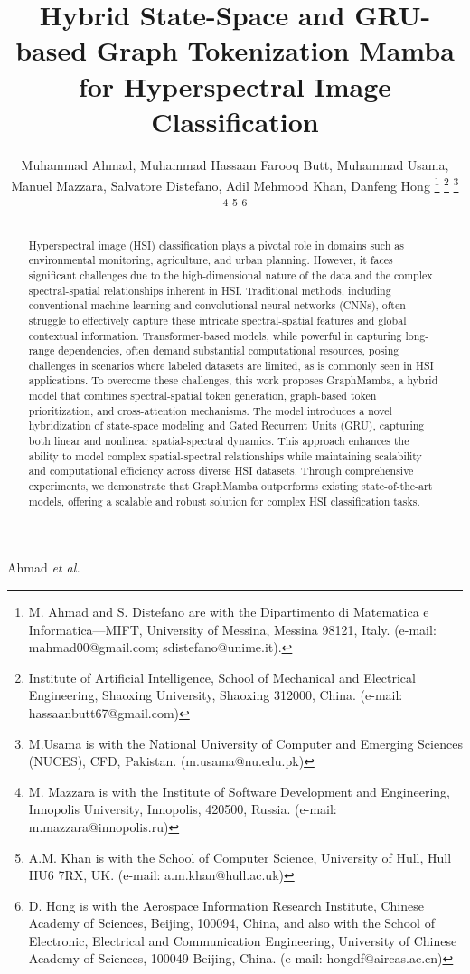 \documentclass[journal]{IEEEtran}
\begin{document}
\title{Hybrid State-Space and GRU-based Graph Tokenization Mamba for Hyperspectral Image Classification}
\author{Muhammad Ahmad, Muhammad Hassaan Farooq Butt, Muhammad Usama, Manuel Mazzara, Salvatore Distefano, Adil Mehmood Khan, Danfeng Hong
\thanks{M. Ahmad and S. Distefano are with the Dipartimento di Matematica e Informatica---MIFT, University of Messina, Messina 98121, Italy. (e-mail: mahmad00@gmail.com; sdistefano@unime.it).}
\thanks{Institute of Artificial Intelligence, School of Mechanical and Electrical Engineering, Shaoxing University, Shaoxing 312000, China. (e-mail: hassaanbutt67@gmail.com)}
\thanks{M.Usama is with the National University of Computer and Emerging Sciences (NUCES), CFD, Pakistan. (m.usama@nu.edu.pk)}
\thanks{M. Mazzara is with the Institute of Software Development and Engineering, Innopolis University, Innopolis, 420500, Russia. (e-mail: m.mazzara@innopolis.ru)}
\thanks{A.M. Khan is with the School of Computer Science, University of Hull, Hull HU6 7RX, UK. (e-mail: a.m.khan@hull.ac.uk)}
\thanks{D. Hong is with the Aerospace Information Research Institute, Chinese Academy of Sciences, Beijing, 100094, China, and also with the School of Electronic, Electrical and Communication Engineering, University of Chinese Academy of Sciences, 100049 Beijing, China. (e-mail: hongdf@aircas.ac.cn)}
}
{Ahmad \MakeLowercase{\textit{et al.}}}
\maketitle
\begin{abstract}
Hyperspectral image (HSI) classification plays a pivotal role in domains such as environmental monitoring, agriculture, and urban planning. However, it faces significant challenges due to the high-dimensional nature of the data and the complex spectral-spatial relationships inherent in HSI. Traditional methods, including conventional machine learning and convolutional neural networks (CNNs), often struggle to effectively capture these intricate spectral-spatial features and global contextual information. Transformer-based models, while powerful in capturing long-range dependencies, often demand substantial computational resources, posing challenges in scenarios where labeled datasets are limited, as is commonly seen in HSI applications. To overcome these challenges, this work proposes GraphMamba, a hybrid model that combines spectral-spatial token generation, graph-based token prioritization, and cross-attention mechanisms. The model introduces a novel hybridization of state-space modeling and Gated Recurrent Units (GRU), capturing both linear and nonlinear spatial-spectral dynamics. This approach enhances the ability to model complex spatial-spectral relationships while maintaining scalability and computational efficiency across diverse HSI datasets. Through comprehensive experiments, we demonstrate that GraphMamba outperforms existing state-of-the-art models, offering a scalable and robust solution for complex HSI classification tasks.
\end{abstract}
\end{document}
